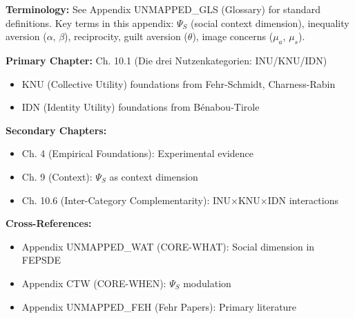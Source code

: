 \begin{tcolorbox}[colback=gray!5!white, colframe=gray!50!black]
\textbf{Terminology:} See Appendix UNMAPPED_GLS (Glossary) for standard definitions.
Key terms in this appendix: $\Psi_S$ (social context dimension),
inequality aversion ($\alpha$, $\beta$), reciprocity, guilt aversion ($\theta$),
image concerns ($\mu_a$, $\mu_s$).
\end{tcolorbox}

\begin{tcolorbox}[colback=green!5!white, colframe=green!75!black,
    title=\textbf{Chapter References}]

\textbf{Primary Chapter:} Ch. 10.1 (Die drei Nutzenkategorien: INU/KNU/IDN)
\begin{itemize}[nosep]
    \item KNU (Collective Utility) foundations from Fehr-Schmidt, Charness-Rabin
    \item IDN (Identity Utility) foundations from Bénabou-Tirole
\end{itemize}

\textbf{Secondary Chapters:}
\begin{itemize}[nosep]
    \item Ch. 4 (Empirical Foundations): Experimental evidence
    \item Ch. 9 (Context): $\Psi_S$ as context dimension
    \item Ch. 10.6 (Inter-Category Complementarity): INU×KNU×IDN interactions
\end{itemize}

\textbf{Cross-References:}
\begin{itemize}[nosep]
    \item Appendix UNMAPPED_WAT (CORE-WHAT): Social dimension in FEPSDE
    \item Appendix CTW (CORE-WHEN): $\Psi_S$ modulation
    \item Appendix UNMAPPED_FEH (Fehr Papers): Primary literature
\end{itemize}

\end{tcolorbox}

